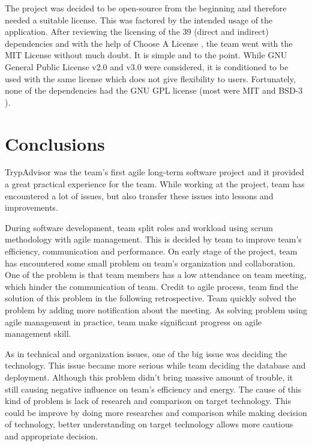 \documentclass{l3proj}
\begin{document}
The project was decided to be open-source from the beginning and therefore needed a suitable license. This was factored by the intended usage of the application. After reviewing the licensing of the 39 (direct and indirect) dependencies and with the help of Choose A License \cite{ChooseALicense}, the team went with the MIT License \cite{MITL} without much doubt. It is simple and to the point. While GNU General Public License \cite{GNUGPL} v2.0 and v3.0 were considered, it is conditioned to be used with the same license which does not give flexibility to users. Fortunately, none of the dependencies had the GNU GPL license (most were MIT and BSD-3 \cite{BSDL}).


\section{Conclusions}
\label{sec:conclusion}

TrypAdvisor was the team's first agile long-term software project and it provided a great practical experience for the team. While working at the project, team has encountered a lot of issues, but also transfer these issues into lessons and improvements.

During software development, team split roles and workload using scrum methodology with agile management. This is decided by team to improve team's efficiency, communication and performance. On early stage of the project, team has encountered some small problem on team's organization and collaboration. One of the problem is that team members has a low attendance on team meeting, which hinder the communication of team. Credit to agile process, team find the solution of this problem in the following retrospective. Team quickly solved the problem by adding more notification about the meeting. As solving problem using agile management in practice, team make significant progress on agile management skill.

As in technical and organization issues, one of the big issue was deciding the technology. This issue became more serious while team deciding the database and deployment. Although this problem didn't bring massive amount of trouble, it still causing negative influence on team's efficiency and energy. The cause of this kind of problem is lack of research and comparison on target technology. This could be improve by doing more researches and comparison while making decision of technology, better understanding on target technology allows more cautious and appropriate decision.
\end{document}
